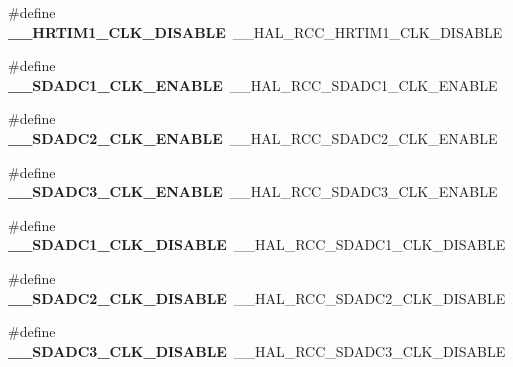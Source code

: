\begin{DoxyCompactItemize}
\item 
\mbox{\label{group___h_a_l___r_c_c___aliased_gaa4f872cf7c18f0c24f989024d5c6578f}} 
\#define {\bfseries \+\_\+\+\_\+\+H\+R\+T\+I\+M1\+\_\+\+C\+L\+K\+\_\+\+D\+I\+S\+A\+B\+LE}~\+\_\+\+\_\+\+H\+A\+L\+\_\+\+R\+C\+C\+\_\+\+H\+R\+T\+I\+M1\+\_\+\+C\+L\+K\+\_\+\+D\+I\+S\+A\+B\+LE
\item 
\mbox{\label{group___h_a_l___r_c_c___aliased_ga276bdce4ddd1f6b148ce55ccf3160500}} 
\#define {\bfseries \+\_\+\+\_\+\+S\+D\+A\+D\+C1\+\_\+\+C\+L\+K\+\_\+\+E\+N\+A\+B\+LE}~\+\_\+\+\_\+\+H\+A\+L\+\_\+\+R\+C\+C\+\_\+\+S\+D\+A\+D\+C1\+\_\+\+C\+L\+K\+\_\+\+E\+N\+A\+B\+LE
\item 
\mbox{\label{group___h_a_l___r_c_c___aliased_ga16ecec4c60d069b7d6c99aefc8956d79}} 
\#define {\bfseries \+\_\+\+\_\+\+S\+D\+A\+D\+C2\+\_\+\+C\+L\+K\+\_\+\+E\+N\+A\+B\+LE}~\+\_\+\+\_\+\+H\+A\+L\+\_\+\+R\+C\+C\+\_\+\+S\+D\+A\+D\+C2\+\_\+\+C\+L\+K\+\_\+\+E\+N\+A\+B\+LE
\item 
\mbox{\label{group___h_a_l___r_c_c___aliased_ga50aefed27799abc72d6b30099a764208}} 
\#define {\bfseries \+\_\+\+\_\+\+S\+D\+A\+D\+C3\+\_\+\+C\+L\+K\+\_\+\+E\+N\+A\+B\+LE}~\+\_\+\+\_\+\+H\+A\+L\+\_\+\+R\+C\+C\+\_\+\+S\+D\+A\+D\+C3\+\_\+\+C\+L\+K\+\_\+\+E\+N\+A\+B\+LE
\item 
\mbox{\label{group___h_a_l___r_c_c___aliased_ga7bee6f236c8a299f3b751b46612348a5}} 
\#define {\bfseries \+\_\+\+\_\+\+S\+D\+A\+D\+C1\+\_\+\+C\+L\+K\+\_\+\+D\+I\+S\+A\+B\+LE}~\+\_\+\+\_\+\+H\+A\+L\+\_\+\+R\+C\+C\+\_\+\+S\+D\+A\+D\+C1\+\_\+\+C\+L\+K\+\_\+\+D\+I\+S\+A\+B\+LE
\item 
\mbox{\label{group___h_a_l___r_c_c___aliased_ga99088247c1f6d91fbc4423f589139445}} 
\#define {\bfseries \+\_\+\+\_\+\+S\+D\+A\+D\+C2\+\_\+\+C\+L\+K\+\_\+\+D\+I\+S\+A\+B\+LE}~\+\_\+\+\_\+\+H\+A\+L\+\_\+\+R\+C\+C\+\_\+\+S\+D\+A\+D\+C2\+\_\+\+C\+L\+K\+\_\+\+D\+I\+S\+A\+B\+LE
\item 
\mbox{\label{group___h_a_l___r_c_c___aliased_ga42ec4cf1c87cbddc3b2298baedddba7b}} 
\#define {\bfseries \+\_\+\+\_\+\+S\+D\+A\+D\+C3\+\_\+\+C\+L\+K\+\_\+\+D\+I\+S\+A\+B\+LE}~\+\_\+\+\_\+\+H\+A\+L\+\_\+\+R\+C\+C\+\_\+\+S\+D\+A\+D\+C3\+\_\+\+C\+L\+K\+\_\+\+D\+I\+S\+A\+B\+LE

\end{DoxyCompactItemize}
